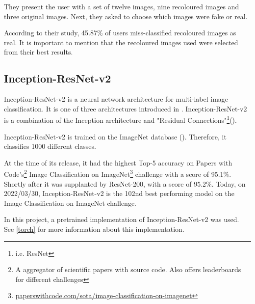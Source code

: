 \documentclass{article}
\begin{document}
        They present the user with a set of twelve images, nine recoloured images and three original images. Next, they asked to choose which images were fake or real.
        
        According to their study, 45.87\% of users miss-classified recoloured images as real. It is important to mention that the recoloured images used were selected from their best results.
    
    
        
    \subsection{Inception-ResNet-v2} \label{resnet}
        Inception-ResNet-v2 is a neural network architecture for multi-label image classification. It is one of three architectures introduced in \cite{szegedy2017inception}. Inception-ResNet-v2 is a combination of the Inception architecture and "Residual Connections"\footnote{i.e. ResNet}(\cite{DeepRes}).
        
        Inception-ResNet-v2 is trained on the ImageNet database (\cite{deng2009imagenet}). Therefore, it classifies 1000 different classes.
        
        At the time of its release, it had the highest Top-5 accuracy on Papers with Code's\footnote{A aggregator of scientific papers with source code. Also offers leaderboards for different challenges} Image Classification on ImageNet\footnote{\href{https://paperswithcode.com/sota/image-classification-on-imagenet?metric=Top\%205\%20Accuracy}{paperswithcode.com/sota/image-classification-on-imagenet}} challenge with a score of 95.1\%. Shortly after it was supplanted by ResNet-200, with a score of 95.2\%. Today, on 2022/03/30, Inception-ResNet-v2 is the 102nd best performing model on the Image Classification on ImageNet challenge.
        
        In this project, a pretrained implementation of Inception-ResNet-v2 was used. See \ref{torch} for more information about this implementation.
\end{document}
